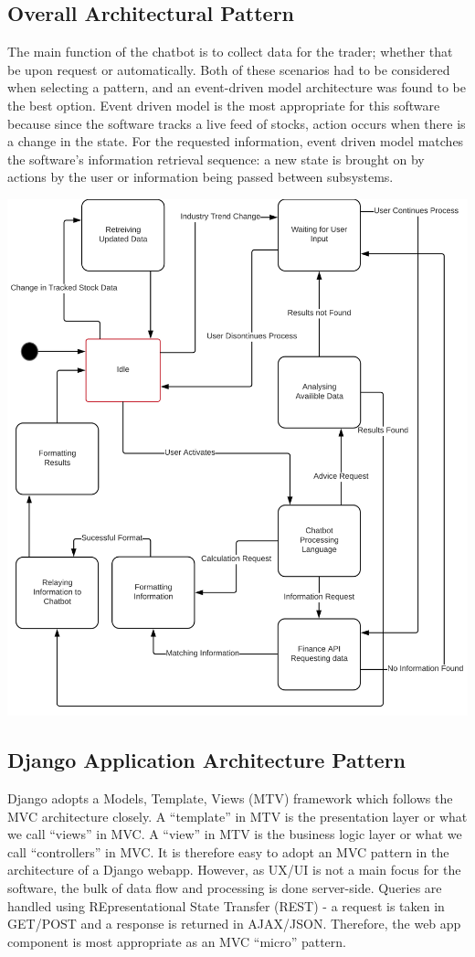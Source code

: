 \documentclass[]{IEEEtran}
\begin{document}
\subsection{Overall Architectural Pattern}
The main function of the chatbot is to collect data for the trader; whether that be upon request or automatically. Both of these scenarios had to be considered when selecting a pattern, and an event-driven model architecture was found to be the best option.  Event driven model is the most appropriate for this software because since the software tracks a live feed of stocks, action occurs when there is a change in the state. For the requested information, event driven model matches the software’s information retrieval sequence: a new state is brought on by actions by the user or information being passed between subsystems.

\includegraphics[scale=0.12]{BasicStateDiagram}

\subsection{Django Application Architecture Pattern}
Django adopts a Models, Template, Views (MTV) framework which follows the MVC architecture closely. A “template” in MTV is the presentation layer or what we call “views” in MVC. A “view” in MTV is the business logic layer or what we call “controllers” in MVC. It is therefore easy to adopt an MVC pattern in the architecture of a Django webapp. However, as UX/UI is not a main focus for the software, the bulk of data flow and processing is done server-side. Queries are handled using REpresentational State Transfer (REST) - a request is taken in GET/POST and a response is returned in AJAX/JSON. Therefore, the web app component is most appropriate as an MVC “micro” pattern.
\end{document}
